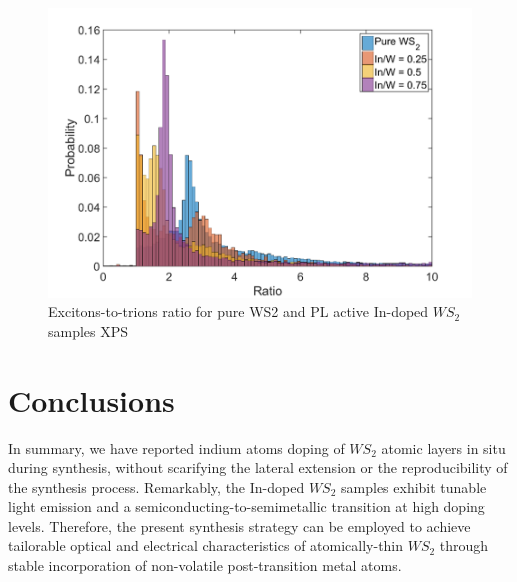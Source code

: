 \begin{figure}[!h]
	\begin{center}
		\includegraphics[scale=0.5]{In/PLRatioHistogram.png}
		\caption{Excitons-to-trions ratio for pure WS2 and PL active In-doped $WS_2$ samples XPS}
		\label{fig:InPLRatioHistogram}
	\end{center}
\end{figure}

\section{Conclusions}

In summary, we have reported indium atoms doping of $WS_2$ atomic layers in situ during synthesis, without scarifying the lateral extension or the reproducibility of the synthesis process. Remarkably, the In-doped $WS_2$ samples exhibit tunable light emission and a semiconducting-to-semimetallic transition at high doping levels. Therefore, the present synthesis strategy can be employed to achieve tailorable optical and electrical characteristics of atomically-thin $WS_2$ through stable incorporation of non-volatile post-transition metal atoms.
